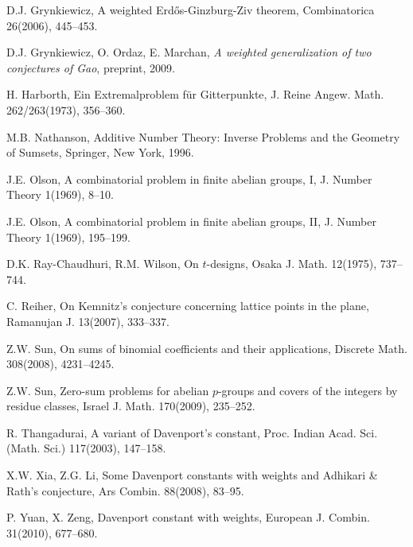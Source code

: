 \documentclass[11pt,reqno]{amsart}
\numberwithin{equation}{section}
\theoremstyle{definition}
\numberwithin{equation}{section}
\begin{document}
\begin{thebibliography}{20}
 D.J. Grynkiewicz, A weighted Erd\H{o}s-Ginzburg-Ziv theorem,
Combinatorica 26(2006), 445--453.

    D.J. Grynkiewicz, O. Ordaz, E. Marchan,
{\it A weighted generalization of two conjectures of Gao}, preprint, 2009.

  H. Harborth, Ein Extremalproblem f\"ur Gitterpunkte,
J. Reine Angew. Math. 262/263(1973), 356--360.

M.B. Nathanson, Additive Number Theory: Inverse Problems and the
Geometry of Sumsets, Springer, New York, 1996.

 J.E. Olson, A combinatorial problem in finite
abelian groups, I,  J. Number Theory 1(1969), 8--10.

 J.E. Olson, A combinatorial problem in finite
abelian groups, II,  J. Number Theory 1(1969), 195--199.

 D.K. Ray-Chaudhuri, R.M.  Wilson,
On $t$-designs,  Osaka J. Math. 12(1975), 737--744.

C. Reiher, On Kemnitz's conjecture concerning lattice points in the
plane,  Ramanujan J. 13(2007), 333--337.

Z.W. Sun, On sums of binomial coefficients and their applications,
Discrete  Math. 308(2008), 4231--4245.

Z.W. Sun, Zero-sum problems for abelian $p$-groups and covers of the
integers by residue classes, Israel J. Math. 170(2009), 235--252.

R. Thangadurai,  A variant of Davenport's constant, Proc. Indian
Acad. Sci. (Math. Sci.) 117(2003), 147--158.

X.W. Xia, Z.G. Li, Some Davenport constants with weights and
Adhikari \& Rath's conjecture,  Ars Combin.  88(2008), 83--95.

 P. Yuan, X. Zeng, Davenport constant with weights,
European J. Combin. 31(2010),  677--680.

\end{thebibliography}
\end{document}
